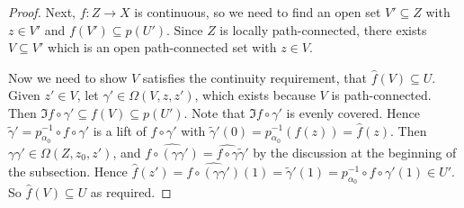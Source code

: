 \begin{proof}
	Next, \( f \colon Z \to X \) is continuous, so we need to find an open set \( V' \subseteq Z \) with \( z \in V' \) and \( f(V') \subseteq p(U') \).
	Since \( Z \) is locally path-connected, there exists \( V \subseteq V' \) which is an open path-connected set with \( z \in V \).

	Now we need to show \( V \) satisfies the continuity requirement, that \( \hat f(V) \subseteq U \).
	Given \( z' \in V \), let \( \gamma' \in \Omega(V,z,z') \), which exists because \( V \) is path-connected.
	Then \( \Im f \circ \gamma' \subseteq f(V) \subseteq p(U') \).
	Note that \( \Im f \circ \gamma' \) is evenly covered.
	Hence \( \widetilde \gamma' = p_{\alpha_0}^{-1} \circ f \circ \gamma' \) is a lift of \( f \circ \gamma' \) with \( \widetilde \gamma'(0) = p_{\alpha_0}^{-1}(f(z)) = \hat f(z) \).
	Then \( \gamma\gamma' \in \Omega(Z,z_0,z') \), and \( \widehat{f \circ (\gamma\gamma')} = \widehat{f \circ \gamma} \widetilde \gamma' \) by the discussion at the beginning of the subsection.
	Hence \( \hat f(z') = \widehat{f \circ (\gamma\gamma')}(1) = \widetilde\gamma'(1) = p_{\alpha_0}^{-1} \circ f \circ \gamma'(1) \in U' \).
	So \( \hat f(V) \subseteq U \) as required.
\end{proof}

